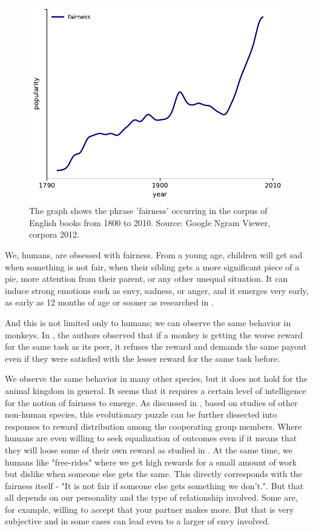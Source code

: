\begin{figure}[htbp]
    \centering
    \includegraphics{img/google_ngram_fairness-eng_2012-1800-2000.pdf}
    \caption{The graph shows the phrase 'fairness' occurring in the corpus of English books from 1800 to 2010. Source: Google Ngram Viewer, corpora 2012. \cite{google_ngram_viewer_2012}}
    \label{fig:popularity_of_fairness}
\end{figure}

We, humans, are obsessed with fairness. From a young age, children will get sad when something is not fair, when their sibling gets a more significant piece of a pie, more attention from their parent, or any other unequal situation. It can induce strong emotions such as envy, sadness, or anger, and it emerges very early, as early as 12 months of age or sooner as researched in \cite{children_fairness}.

And this is not limited only to humans; we can observe the same behavior in monkeys. In \cite{brosnan2003monkeys}, the authors observed that if a monkey is getting the worse reward for the same task as its peer,  it refuses the reward and demands the same payout even if they were satisfied with the lesser reward for the same task before.

We observe the same behavior in many other species, but it does not hold for the animal kingdom in general. It seems that it requires a certain level of intelligence for the notion of fairness to emerge. As discussed in \cite{brosnan2014evolution}, based on studies of other non-human species, this evolutionary puzzle can be further dissected into responses to reward distribution among the cooperating group members. Where humans are even willing to seek equalization of outcomes even if it means that they will loose some of their own reward as studied in \cite{willing_to_pay_to_equality}. At the same time, we humans like "free-rides" where we get high rewards for a small amount of work but dislike when someone else gets the same. This directly corresponds with the fairness itself - "It is not fair if someone else gets something we don't.". But that all depends on our personality and the type of relationship involved. Some are, for example, willing to accept that your partner makes more. But that is very subjective and in some cases can lead even to a larger of envy involved.

